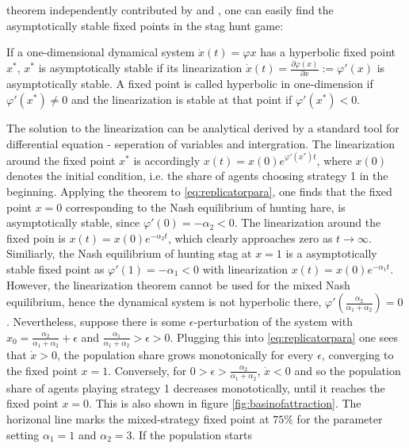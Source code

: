 \documentclass[11pt]{article}
\begin{document}
theorem independently contributed by \cite{hartman_lemma_1960} and 
\cite{grobman_homeomorphism_1959}, one can easily 
find the asymptotically stable fixed points in the stag hunt game:
\begin{mydef}
        If a one-dimensional dynamical system $\dot{x}(t) = \varphi{x}$ 
        has a hyperbolic fixed point $x^*$, $x^*$ is asymptotically stable
        if its linearization 
        $\dot{x}(t) = \frac{\partial\varphi(x)}{\partial x} := \varphi'(x)$ 
        is asymptotically stable. 
        A fixed point is called hyperbolic in one-dimension if 
        $\varphi'(x^*) \neq 0$ and the linearization is stable at that
        point if $\varphi'(x^*) < 0$.
\end{mydef}
The solution to the linearization can be analytical derived by 
a standard tool for differential equation - seperation of variables and 
intergration.
The linearization around the fixed point $x^*$ is accordingly
$x(t)= x(0) e^{\varphi'(x^*)t}$, where $x(0)$ denotes the 
initial condition, i.e. the share of agents choosing strategy 1 in the 
beginning.
Applying the theorem to \eqref{eq:replicatorpara}, one finds that the 
fixed point $x=0$ corresponding to the Nash equilibrium of hunting hare, is 
asymptotically stable, since $\varphi'(0) = - \alpha_2 <0$. 
The linearization around the fixed poin is $x(t) = x(0) e^{-\alpha_2 t}$, 
which clearly approaches zero as $t \rightarrow \infty$. 
Similiarly, the Nash equilibrium 
of hunting stag at $x=1$ is a asymptotically stable fixed point as
$\varphi'(1) = -\alpha_1 <0$ with linearization $x(t) = x(0) e^{-\alpha_1 t}$.
However, the linearization theorem cannot be used for the mixed Nash 
equilibrium, hence the dynamical system is not hyperbolic there, 
$\varphi'(\frac{\alpha_2}{\alpha_1+\alpha_2}) = 0$. Nevertheless, suppose 
there is some $\epsilon$-perturbation of the system  
 with $x_0= \frac{\alpha_2}{\alpha_1+\alpha_2}+ \epsilon$ and 
 $\frac{\alpha_1}{\alpha_1+\alpha_2} > \epsilon > 0$. Plugging this into
 \eqref{eq:replicatorpara} one sees that $\dot{x} >0$, the population share
 grows monotonically for every $\epsilon$, converging to the fixed point 
 $x = 1$. Conversely, for $0 > \epsilon > \frac{\alpha_2}{\alpha_1+\alpha_2}$,
 $\dot{x} < 0$ and so the population share of agents 
 playing strategy 1 decreases monototically, until it reaches the 
 fixed point $x=0$. This is also shown in figure \ref{fig:basinofattraction}.
 The horizonal line marks the mixed-strategy fixed point at $75\%$ for the
 parameter setting $\alpha_1 = 1$ and $\alpha_2=3$. If the population starts
\end{document}

